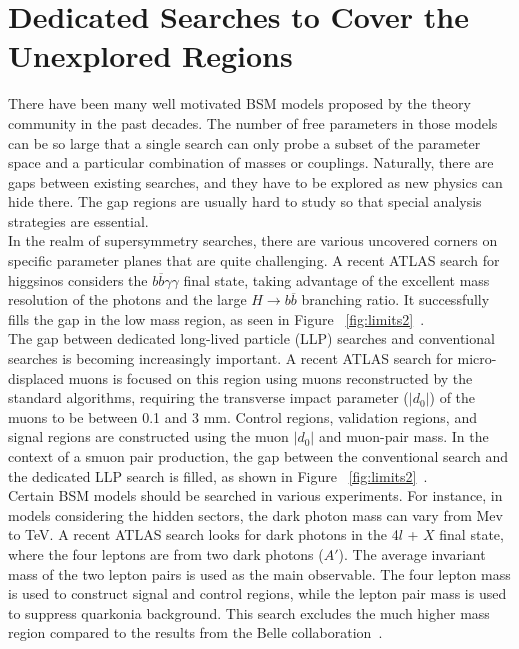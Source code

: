 \documentclass{moriond}
\begin{document}
\section{Dedicated Searches to Cover the Unexplored Regions}

There have been many well motivated BSM models proposed by the theory community
in the past decades. The number of free parameters in those models can be so
large that a single search can only probe a subset of the parameter space and a
particular combination of masses or couplings. Naturally, there are gaps
between existing searches, and they have to be explored as new physics can hide
there. The gap regions are usually hard to study so that special analysis
strategies are essential.\\

In the realm of supersymmetry searches, there are various uncovered corners on
specific parameter planes that are quite challenging. A recent ATLAS search for
higgsinos considers the $b\overline{b}\gamma\gamma$ final state, taking
advantage of the excellent mass resolution of the photons and the large
$H\rightarrow b\overline{b}$ branching ratio. It successfully fills the gap in
the low mass region, as seen in Figure
~\ref{fig:limits2}~\cite{bbyy}.\\

The gap between dedicated long-lived particle (LLP) searches and conventional
searches is becoming increasingly important. A recent ATLAS search for
micro-displaced muons is focused on this region using muons reconstructed by
the standard algorithms, requiring the transverse impact parameter ($|d_{0}|$)
of the muons to be between 0.1 and 3 mm. Control regions, validation regions,
and signal regions are constructed using the muon $|d_{0}|$ and muon-pair mass.
In the context of a smuon pair production, the gap between the conventional search
and the dedicated LLP search is filled, as shown in Figure
~\ref{fig:limits2}~\cite{micro}.\\   

Certain BSM models should be searched in various experiments. For instance, in models considering the
hidden sectors, the dark photon mass can vary from Mev to TeV. A recent
ATLAS search looks for dark photons in the 4$l$ + $X$ final state, where the
four leptons are from two dark photons ($A'$). The average invariant mass of
the two lepton pairs is used as the main observable. The four lepton mass is
used to construct signal and control regions, while the lepton pair mass is
used to suppress quarkonia background.  This search excludes the much higher
mass region compared to the results from the Belle collaboration~\cite{dark}.\\
\end{document}
